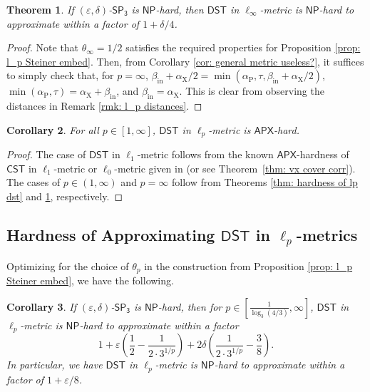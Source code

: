 \documentclass{article}\providecommand{\DeclareRedundantLanguages}[2]{}\usepackage[a4paper,margin=20mm]{geometry}
\newtheorem{theorem}{Theorem}\newtheorem{lemma}[theorem]{Lemma}\newtheorem{proposition}[theorem]{Proposition}\newtheorem{corollary}[theorem]{Corollary}\newtheorem{definition}[theorem]{Definition}\newtheorem{claim}[theorem]{Claim}\newtheorem{remark}[theorem]{Remark}\newtheorem{observation}[theorem]{Observation}\newtheorem{conjecture}[theorem]{Conjecture}\newtheorem{example}[theorem]{Example}
\newcommand{\1}{\textbf{1}}
\newcommand{\cst}{$\mathsf{CST}$\xspace}
\newcommand{\setpT}{$\mathsf{SP_3}$\xspace}
\newcommand{\dst}{$\mathsf{DST}$\xspace}
\newcommand{\np}{$\mathsf{NP}$\xspace}
\newcommand{\apx}{$\mathsf{APX}$\xspace}
\newcommand{\td}{\tau}
\newcommand{\pcoord}{\theta_p}
\newcommand{\srd}{\alpha_{\text{X}}}
\newcommand{\trd}{\alpha_{\text{P}}}
\begin{document}
\begin{theorem} \label{thm: graph l_inf hardness}
If $(\varepsilon, \delta)$-\setpT is \np-hard, then \dst in $\ell_{\infty}$-metric is \np-hard to approximate within a factor of $1 + \delta/4$.
\end{theorem}
\begin{proof}
Note that $\theta_{\infty} = 1/2$ satisfies the required properties for Proposition \ref{prop: l_p Steiner embed}. Then, from Corollary \ref{cor: general metric useless?}, it suffices to simply check that, for $p = \infty$, $\beta_{\text{in}} + \srd/2 = \min(\trd, \td, \beta_{\text{in}} + \srd/2)$, $\min(\trd, \td) = \srd + \beta_{\text{in}}$, and $\beta_{\text{in}} = \srd$. This is clear from observing the distances in Remark \ref{rmk: l_p distances}.
\end{proof}

\begin{corollary}
For all $p \in [1, \infty]$,  \dst in $\ell_p$-metric is \apx-hard.
\end{corollary}
\begin{proof}
The case of \dst in $\ell_1$-metric follows from the known \apx-hardness of  \cst in $\ell_1$-metric or $\ell_0$-metric given in  \cite{Trevisan00} (or see Theorem~\ref{thm: vx cover corr}).   The cases of $p \in (1, \infty)$ and $p = \infty$ follow from Theorems \ref{thm: hardness of lp dst} and \ref{thm: graph l_inf hardness}, respectively.
\end{proof}



\subsection{Hardness of Approximating  \texorpdfstring{\dst}{DST} in \texorpdfstring{$\ell_p$}{lp}-metrics}\label{sec:figureexp}
Optimizing for the choice of $\pcoord$ in the construction from Proposition \ref{prop: l_p Steiner embed}, we have the following.
\begin{corollary} \label{cor: l_p tight hardness}
If $(\varepsilon, \delta)$-\setpT is \np-hard, then for $p \in [\frac{1}{\log_3(4/3)}, \infty]$,  \dst in $\ell_p$-metric is \np-hard to approximate within a
factor
\[ 
1+ \varepsilon \left(\frac{1}{2}-\frac{1}{2\cdot3^{1/p}} \right) + 2\delta \left(\frac{1}{2\cdot3^{1/p}}-\frac{3}{8} \right).
\]
In particular, we have  \dst in $\ell_p$-metric is \np-hard to approximate within a factor of $1 + \varepsilon/8$.
\end{corollary}
\end{document}

